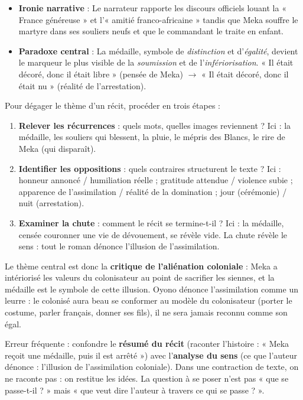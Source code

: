 \documentclass[11pt]{article}
\newcommand{\cle}[1]{{\popxbold\color{popdark}#1}}
\begin{document}
\begin{exemplebox}
\begin{itemize}
\item \textbf{Ironie narrative} : Le narrateur rapporte les discours officiels louant la « France généreuse » et l'« amitié franco-africaine » tandis que Meka souffre le martyre dans ses souliers neufs et que le commandant le traite en enfant.
\item \textbf{Paradoxe central} : La médaille, symbole de \emph{distinction} et d'\emph{égalité}, devient le marqueur le plus visible de la \emph{soumission} et de l'\emph{infériorisation}. « Il était décoré, donc il était libre » (pensée de Meka) $\rightarrow$ « Il était décoré, donc il était nu » (réalité de l'arrestation).
\end{itemize}
\end{exemplebox}

\begin{methode}
Pour dégager le thème d'un récit, procéder en trois étapes :
\begin{enumerate}
\item \textbf{Relever les récurrences} : quels mots, quelles images reviennent ? Ici : la médaille, les souliers qui blessent, la pluie, le mépris des Blancs, le rire de Meka (qui disparaît).
\item \textbf{Identifier les oppositions} : quels contraires structurent le texte ? Ici : honneur annoncé / humiliation réelle ; gratitude attendue / violence subie ; apparence de l'assimilation / réalité de la domination ; jour (cérémonie) / nuit (arrestation).
\item \textbf{Examiner la chute} : comment le récit se termine-t-il ? Ici : la médaille, censée couronner une vie de dévouement, se révèle vide. La chute révèle le sens : tout le roman dénonce l'illusion de l'assimilation.
\end{enumerate}
\end{methode}

Le \cle{thème central} est donc la \textbf{critique de l'aliénation coloniale} : Meka a intériorisé les valeurs du colonisateur au point de sacrifier les siennes, et la médaille est le symbole de cette illusion. Oyono dénonce l'\cle{assimilation} comme un leurre : le colonisé aura beau se conformer au modèle du colonisateur (porter le costume, parler français, donner ses fils), il ne sera jamais reconnu comme son égal.

\begin{attention}
Erreur fréquente : confondre le \textbf{résumé du récit} (raconter l'histoire : « Meka reçoit une médaille, puis il est arrêté ») avec l'\textbf{analyse du sens} (ce que l'auteur dénonce : l'illusion de l'assimilation coloniale). Dans une contraction de texte, on ne raconte pas : on restitue les idées. La question à se poser n'est pas « que se passe-t-il ? » mais « que veut dire l'auteur à travers ce qui se passe ? ».
\end{attention}
\end{document}
